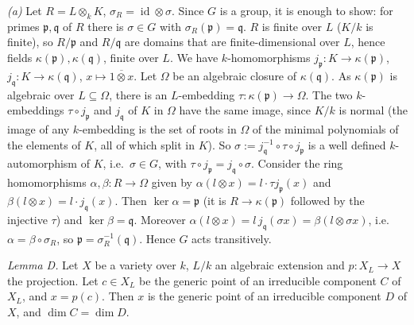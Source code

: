 \documentclass[11pt]{article}
\begin{document}
\emph{(a)} Let $R=L\otimes_kK$, $\sigma_R=\operatorname{id}\otimes\sigma$. Since $G$ is a group, it is enough to show: for primes $\mathfrak p,\mathfrak q$ of $R$ there is $\sigma\in G$ with $\sigma_R(\mathfrak p)=\mathfrak q$. $R$ is finite over $L$ ($K/k$ is finite), so $R/\mathfrak p$ and $R/\mathfrak q$ are domains that are finite-dimensional over $L$, hence fields $\kappa(\mathfrak p),\kappa(\mathfrak q)$, finite over $L$. We have $k$-homomorphisms $j_{\mathfrak p}:K\to\kappa(\mathfrak p)$, $j_{\mathfrak q}:K\to\kappa(\mathfrak q)$, $x\mapsto\overline{1\otimes x}$. Let $\Omega$ be an algebraic closure of $\kappa(\mathfrak q)$. As $\kappa(\mathfrak p)$ is algebraic over $L\subseteq\Omega$, there is an $L$-embedding $\tau:\kappa(\mathfrak p)\to\Omega$. The two $k$-embeddings $\tau\circ j_{\mathfrak p}$ and $j_{\mathfrak q}$ of $K$ in $\Omega$ have the same image, since $K/k$ is normal (the image of any $k$-embedding is the set of roots in $\Omega$ of the minimal polynomials of the elements of $K$, all of which split in $K$). So $\sigma:=j_{\mathfrak q}^{-1}\circ\tau\circ j_{\mathfrak p}$ is a well defined $k$-automorphism of $K$, i.e.\ $\sigma\in G$, with $\tau\circ j_{\mathfrak p}=j_{\mathfrak q}\circ\sigma$. Consider the ring homomorphisms $\alpha,\beta:R\to\Omega$ given by $\alpha(l\otimes x)=l\cdot\tau j_{\mathfrak p}(x)$ and $\beta(l\otimes x)=l\cdot j_{\mathfrak q}(x)$. Then $\ker\alpha=\mathfrak p$ (it is $R\to\kappa(\mathfrak p)$ followed by the injective $\tau$) and $\ker\beta=\mathfrak q$. Moreover $\alpha(l\otimes x)=l\,j_{\mathfrak q}(\sigma x)=\beta(l\otimes\sigma x)$, i.e.\ $\alpha=\beta\circ\sigma_R$, so $\mathfrak p=\sigma_R^{-1}(\mathfrak q)$. Hence $G$ acts transitively.

\emph{Lemma D.} Let $X$ be a variety over $k$, $L/k$ an algebraic extension and $p:X_L\to X$ the projection. Let $c\in X_L$ be the generic point of an irreducible component $C$ of $X_L$, and $x=p(c)$. Then $x$ is the generic point of an irreducible component $D$ of $X$, and $\dim C=\dim D$.
\end{document}

